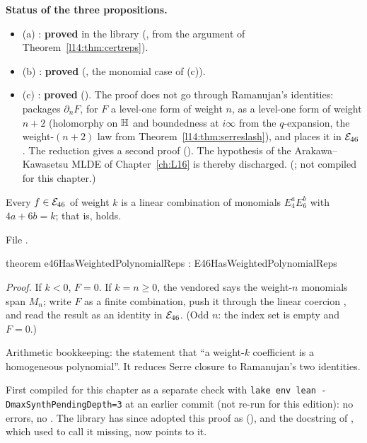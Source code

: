 \begin{status}
\textbf{Status of the three propositions.}
\begin{itemize}
\item (a) : \textbf{proved} in the library (,
  from the argument of Theorem~\ref{l14:thm:certreps}).
\item (b) : \textbf{proved} (, the monomial case of (c)).
\item (c) : \textbf{proved} (). The proof does not go through Ramanujan's
  identities:  packages $\partial_nF$, for $F$ a level-one form of weight $n$, as a level-one form of weight
  $n+2$ (holomorphy on $\mathbb{H}$ and boundedness at $i\infty$ from the $q$-expansion, the weight-$(n+2)$ law from
  Theorem~\ref{l14:thm:serreslash}), and  places it in $\mathcal{E}_{46}$. The reduction
   gives a second proof (). The hypothesis
   of the Arakawa--Kawasetsu MLDE of Chapter~\ref{ch:L16} is thereby discharged.
  (; not compiled for this chapter.)
\end{itemize}
\end{status}

\begin{theorem}\label{l14:thm:certreps}
Every $f\in\mathcal{E}_{46}$ of weight $k$ is a linear combination of monomials $E_4^aE_6^b$ with $4a+6b=k$; that is,
 holds.
\end{theorem}
\noindent File .
\begin{plaincode}
theorem e46HasWeightedPolynomialReps : E46HasWeightedPolynomialReps
\end{plaincode}
\noindent\emph{Proof.} If $k<0$, $F=0$. If $k = n\ge0$, the vendored  says the
weight-$n$ monomials span $M_n$; write $F$ as a finite combination, push it through the linear coercion , and
read the result as an identity in $\mathcal{E}_{46}$. (Odd $n$: the index set  is empty and $F=0$.)
\begin{physics}
Arithmetic bookkeeping: the statement that ``a weight-$k$ coefficient is a homogeneous polynomial''. It reduces Serre closure
to Ramanujan's two identities.
\end{physics}
\begin{status}
First compiled for this chapter as a separate check with \texttt{lake env lean -DmaxSynthPendingDepth=3} at an earlier commit (not re-run for this edition): no errors, no
. The library has since adopted this proof as 
(), and the docstring of , which used to call it
missing, now points to it.
\end{status}

